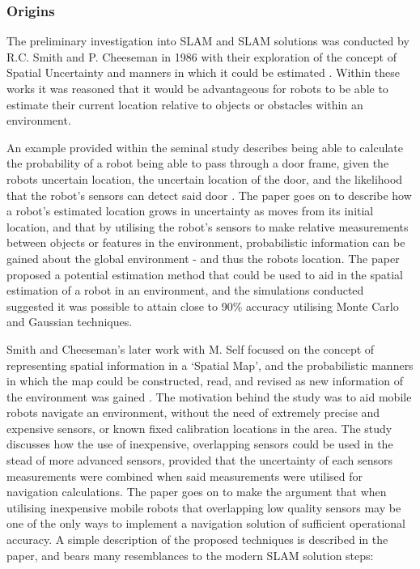 \subsubsection{Origins}
The preliminary investigation into SLAM and SLAM solutions was conducted by
R.C. Smith and P. Cheeseman in 1986 with their exploration of the concept of
Spatial Uncertainty and manners in which it could be estimated
\cite{Smith1986,Smith1988}.
Within these works it was reasoned that it would be advantageous for robots to
be able to estimate their current location relative to objects or obstacles
within an environment.

An example provided within the seminal study describes being
able to calculate the probability of a robot being able to pass through a
door frame, given the robots uncertain location, the uncertain location of the
door, and the likelihood that the robot's sensors can detect said door
\cite{Smith1986}. 
The paper goes on to describe how a robot's estimated location grows in
uncertainty as moves from its initial location, and that by utilising the
robot's sensors to make relative measurements between objects or features in the
environment, probabilistic information can be gained about the global
environment - and thus the robots location.
The paper proposed a potential estimation method that could be used to aid
in the spatial estimation of a robot in an environment, and the simulations
conducted suggested it was possible to attain close to 90\% accuracy utilising
Monte Carlo and Gaussian techniques.

Smith and Cheeseman's later work with M. Self focused on the concept of
representing spatial information in a `Spatial Map', and the probabilistic
manners in which the map could be constructed, read, and revised as new
information of the environment was gained \cite{Smith1988}.
The motivation behind the study was to aid mobile robots navigate an
environment, without the need of extremely precise and expensive sensors, or
known fixed calibration locations in the area.
The study discusses how the use of inexpensive, overlapping sensors could be
used in the stead of more advanced sensors, provided that the uncertainty of
each sensors measurements were combined when said measurements were utilised
for navigation calculations.
The paper goes on to make the argument that when utilising inexpensive mobile
robots that overlapping low quality sensors may be one of the only ways to
implement a navigation solution of sufficient operational accuracy.
A simple description of the proposed techniques is described in the paper, and
bears many resemblances to the modern SLAM solution steps:

